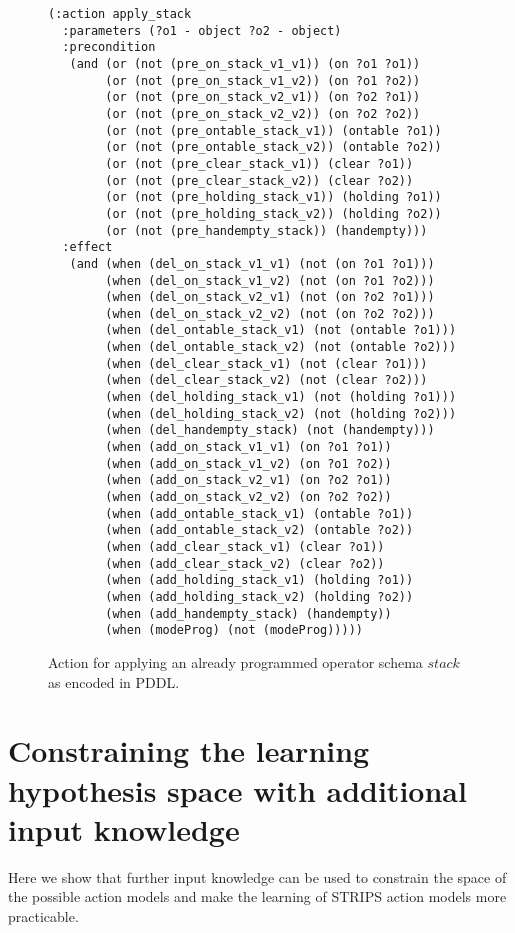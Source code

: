 \documentclass[letterpaper]{article} %
\begin{document}
\begin{figure}[hbt]
\begin{scriptsize}
\begin{verbatim}
(:action apply_stack
  :parameters (?o1 - object ?o2 - object)
  :precondition
   (and (or (not (pre_on_stack_v1_v1)) (on ?o1 ?o1))
        (or (not (pre_on_stack_v1_v2)) (on ?o1 ?o2))
        (or (not (pre_on_stack_v2_v1)) (on ?o2 ?o1))
        (or (not (pre_on_stack_v2_v2)) (on ?o2 ?o2))
        (or (not (pre_ontable_stack_v1)) (ontable ?o1))
        (or (not (pre_ontable_stack_v2)) (ontable ?o2))
        (or (not (pre_clear_stack_v1)) (clear ?o1))
        (or (not (pre_clear_stack_v2)) (clear ?o2))
        (or (not (pre_holding_stack_v1)) (holding ?o1))
        (or (not (pre_holding_stack_v2)) (holding ?o2))
        (or (not (pre_handempty_stack)) (handempty)))
  :effect
   (and (when (del_on_stack_v1_v1) (not (on ?o1 ?o1)))
        (when (del_on_stack_v1_v2) (not (on ?o1 ?o2)))
        (when (del_on_stack_v2_v1) (not (on ?o2 ?o1)))
        (when (del_on_stack_v2_v2) (not (on ?o2 ?o2)))
        (when (del_ontable_stack_v1) (not (ontable ?o1)))
        (when (del_ontable_stack_v2) (not (ontable ?o2)))
        (when (del_clear_stack_v1) (not (clear ?o1)))
        (when (del_clear_stack_v2) (not (clear ?o2)))
        (when (del_holding_stack_v1) (not (holding ?o1)))
        (when (del_holding_stack_v2) (not (holding ?o2)))
        (when (del_handempty_stack) (not (handempty)))
        (when (add_on_stack_v1_v1) (on ?o1 ?o1))
        (when (add_on_stack_v1_v2) (on ?o1 ?o2))
        (when (add_on_stack_v2_v1) (on ?o2 ?o1))
        (when (add_on_stack_v2_v2) (on ?o2 ?o2))
        (when (add_ontable_stack_v1) (ontable ?o1))
        (when (add_ontable_stack_v2) (ontable ?o2))
        (when (add_clear_stack_v1) (clear ?o1))
        (when (add_clear_stack_v2) (clear ?o2))
        (when (add_holding_stack_v1) (holding ?o1))
        (when (add_holding_stack_v2) (holding ?o2))
        (when (add_handempty_stack) (handempty))
        (when (modeProg) (not (modeProg)))))
\end{verbatim}
\end{scriptsize}
 \caption{\small Action for applying an already programmed operator schema $stack$ as encoded in PDDL.}
\label{fig:compilation}
\end{figure}


\section{Constraining the learning hypothesis space with additional input knowledge}
Here we show that further input knowledge can be used to constrain the space of the possible action models and make the learning of STRIPS action models more practicable.
\end{document}
